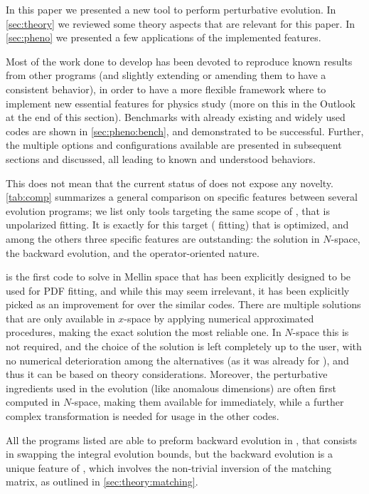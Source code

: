In this paper we presented a new \qcd{} tool to perform perturbative \dglap{}
evolution.
In \cref{sec:theory} we reviewed some theory aspects that are relevant
for this paper. In \cref{sec:pheno} we presented a few applications
of the implemented \eko{} features.

Most of the work done to develop \eko{} has been devoted to reproduce known
results from other programs (and slightly extending or amending them to have a
consistent behavior), in order to have a more flexible framework where to
implement new essential features for physics study (more on this in the Outlook
at the end of this section).
Benchmarks with already existing and widely used codes are shown in
\cref{sec:pheno:bench}, and demonstrated to be successful.
Further, the multiple options and configurations available are presented in
subsequent sections and discussed, all leading to known and understood
behaviors.

This does not mean that the current status of \eko{} does not expose any
novelty. \cref{tab:comp} summarizes a general comparison on specific features
between several evolution programs; we list only tools targeting the same scope
of \eko{}, that is unpolarized \pdf{} fitting.
It is exactly for this target (\pdf{} fitting) that \eko{} is optimized, and
among the others three specific features are outstanding: the solution in
$N$-space, the backward \vfns{} evolution, and the operator-oriented nature.

\eko{} is the first code to solve \dglap{} in Mellin space that has been
explicitly designed to be used for PDF fitting, and while this may seem
irrelevant, it has been explicitly picked as an improvement for \eko{} over the
similar codes.
There are multiple solutions that are only available in $x$-space by applying
numerical approximated procedures, making the exact solution the most reliable
one. In $N$-space this is not required, and the choice of the solution is
left completely up to the user, with no numerical deterioration among the
alternatives (as it was already for \pegasus{}), and thus it can be based on
theory considerations.
Moreover, the perturbative \qcd{} ingredients used in the evolution (like
anomalous dimensions) are often first computed in $N$-space, making them
available for \eko{} immediately, while a further complex transformation is
needed for usage in the other codes.

All the programs listed are able to preform backward evolution in \ffns{}, that
consists in swapping the integral evolution bounds, but the \vfns{} backward
evolution is a unique feature of \eko{}, which involves the non-trivial
inversion of the matching matrix, as outlined in \cref{sec:theory:matching}.

